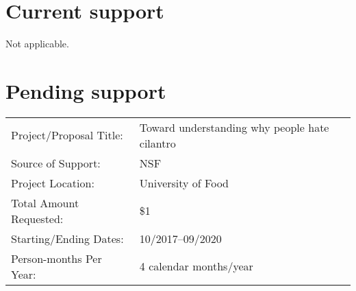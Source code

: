 \documentclass[nsfcurrentpending]{nsfproposal}
\begin{document}
\section*{Current support}
Not applicable.

\section*{Pending support}
\begin{tabular}{p{} p{}}
\hline
	Project/Proposal Title: & Toward understanding why people hate cilantro\\
	Source of Support:      & NSF\\
	Project Location:       & University of Food\\
	Total Amount Requested: & \$1\\
	Starting/Ending Dates:  & 10/2017--09/2020\\
	Person-months Per Year: & 4 calendar months/year\\
\hline
\end{tabular}
\end{document}
